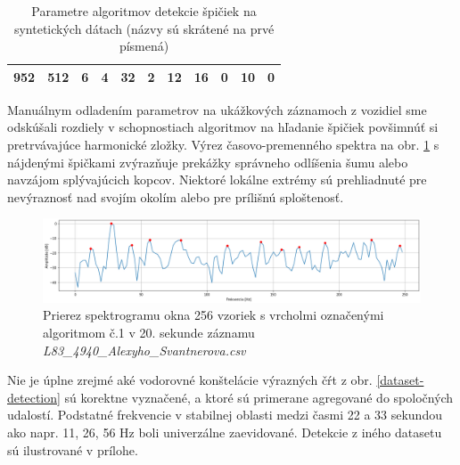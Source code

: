 \begin{table}[h]
\begin{tabular}{|c|c|ccc|cc|cccc|}
952                                                                               & 512                                                                     & \multicolumn{1}{c|}{6}           & \multicolumn{1}{c|}{4}                  & 32                & \multicolumn{1}{c|}{2}                                 & 12                                & \multicolumn{1}{c|}{16}  & \multicolumn{1}{c|}{0}   & \multicolumn{1}{c|}{10}  & 0   \\ \hline
\end{tabular}
\caption{Parametre algoritmov detekcie špičiek na syntetických dátach (názvy sú skrátené na prvé písmená)}
\label{tab:grid-serach-parameters}
\end{table}

Manuálnym odladením parametrov na ukážkových záznamoch z vozidiel sme odskúšali rozdiely v schopnostiach algoritmov
na hľadanie špičiek povšimnúť si pretrvávajúce harmonické zložky. Výrez časovo-premenného spektra na obr. \ref{spectrum-slice}
s nájdenými špičkami zvýrazňuje prekážky správneho odlíšenia šumu alebo navzájom splývajúcich kopcov. Niektoré lokálne extrémy
sú prehliadnuté pre nevýraznosť nad svojím okolím alebo pre prílišnú sploštenosť.
\begin{figure}[h]
   \centering
    \includegraphics[width=\textwidth]{figures/verification/L83-slice-t-20-A1.png}
   \caption{Prierez spektrogramu okna 256 vzoriek s vrcholmi označenými algoritmom č.1
   v 20. sekunde záznamu \emph{L83\_4940\_Alexyho\_Svantnerova.csv}}
   \label{spectrum-slice}
\end{figure}

Nie je úplne zrejmé aké vodorovné konštelácie výrazných čŕt z obr. \ref{dataset-detection} sú korektne vyznačené,
a ktoré sú primerane agregované do spoločných udalostí. Podstatné frekvencie v stabilnej oblasti medzi časmi 22 a 33
sekundou ako napr. 11, 26, 56 Hz  boli univerzálne zaevidované. Detekcie z iného datasetu sú ilustrované v prílohe.

